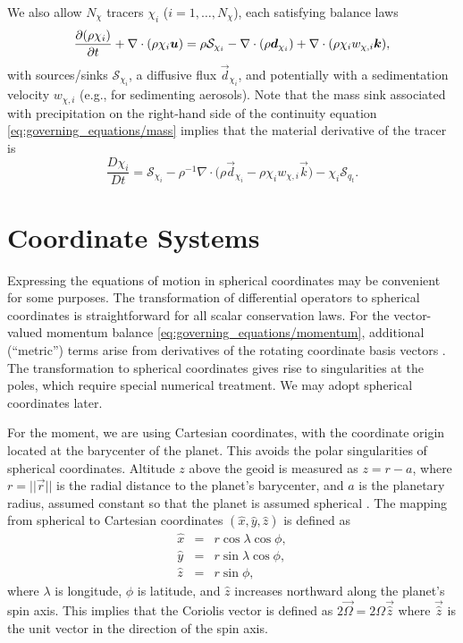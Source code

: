 \documentclass{report}
\begin{document}
We also allow $N_\chi$ tracers $\chi_i$ ($i=1, \dots, N_\chi$), each satisfying balance laws
\begin{equation}
\frac{\partial (\rho \chi_i)}{\partial t} + \nabla \cdot \left(\rho \chi_i \boldsymbol{{u}} \right) = \rho \mathcal{S}_{\chi_i} - \nabla \cdot (\rho \boldsymbol{{d}}_{\chi_i}) + \nabla \cdot (\rho \chi_{i} w_{\chi, i} \boldsymbol{{k}}),   
\label{eq:tracers}
\end{equation}
with sources/sinks $\mathcal{S}_{\chi_i}$, a diffusive flux $\vec{d}_{\chi_i}$, and potentially with a sedimentation velocity $w_{\chi, i}$ (e.g., for sedimenting aerosols). Note that the mass sink associated with precipitation on the right-hand side of the continuity equation \eqref{eq:governing_equations/mass} implies that the material derivative of the tracer is 
\[
\frac{D\chi_i}{Dt} = \mathcal{S}_{\chi_i} - \rho^{-1} \nabla \cdot \bigl(\rho \vec{d}_{\chi_i} - \rho \chi_{i} w_{\chi, i} \vec{k}\bigr)- \chi_i \mathcal{S}_{q_t}.
\]
 
\section{Coordinate Systems}

Expressing the equations of motion in spherical coordinates may be convenient for some purposes. The transformation of differential operators to spherical coordinates is straightforward for all scalar conservation laws. For the vector-valued momentum balance \eqref{eq:governing_equations/momentum}, additional (``metric'') terms arise from derivatives of the rotating coordinate basis vectors \citep[e.g.,][]{Staniforth03a}. The transformation to spherical coordinates gives rise to singularities at the poles, which require special numerical treatment.  We may adopt spherical coordinates later. 

For the moment, we are using Cartesian coordinates, with the coordinate origin located at the barycenter of the planet. This avoids the polar singularities of spherical coordinates. Altitude $z$ above the geoid is measured as $z=r-a$, where $r=||\vec{r}||$ is the radial distance to the planet's barycenter, and $a$ is the planetary radius, assumed constant so that the planet is assumed spherical \citep[see][]{giraldo:2001,giraldo:2002,giraldo:2013}. The mapping from spherical to Cartesian coordinates $(\hat x, \hat y, \hat z)$ is defined as
\begin{eqnarray*}
\hat x &=& r \cos \lambda \cos \phi,\\
\hat y &=& r \sin \lambda \cos \phi, \\
\hat z &=& r \sin \phi,
\end{eqnarray*}
where $\lambda$ is longitude, $\phi$ is latitude, and $\hat z$ increases northward along the planet's spin axis. This implies that the Coriolis vector is defined as $2 \vec{\Omega} = 2 \Omega \vec{\hat z}$ where $\vec{\hat z}$ is the unit vector in the direction of the spin axis. 
\end{document}

